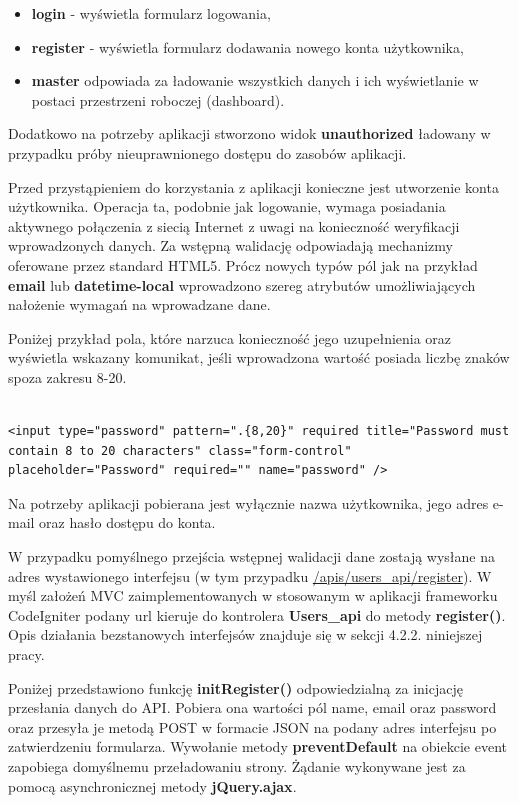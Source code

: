 \begin{itemize}
\item \textbf{login} - wyświetla formularz logowania,
\item \textbf{register} - wyświetla formularz dodawania nowego konta użytkownika,
\item \textbf{master} odpowiada za ładowanie wszystkich danych i ich wyświetlanie w postaci przestrzeni roboczej (dashboard).
\end{itemize}

Dodatkowo na potrzeby aplikacji stworzono widok \textbf{unauthorized} ładowany w przypadku próby nieuprawnionego dostępu do zasobów aplikacji.

Przed przystąpieniem do korzystania z aplikacji konieczne jest utworzenie konta użytkownika. Operacja ta, podobnie jak logowanie, wymaga posiadania aktywnego połączenia z siecią Internet z uwagi na konieczność weryfikacji wprowadzonych danych. Za wstępną walidację odpowiadają mechanizmy oferowane przez standard HTML5\cite{html5Valid}. Prócz nowych typów pól jak na przykład \textbf{email} lub \textbf{datetime-local} wprowadzono szereg atrybutów umożliwiających nałożenie wymagań na wprowadzane dane.

Poniżej przykład pola, które narzuca konieczność jego uzupełnienia oraz wyświetla wskazany komunikat, jeśli wprowadzona wartość posiada liczbę znaków spoza zakresu 8-20.

\begin{lstlisting}[caption=Przykład pola "hasło" w widoku rejestracji., label=amb, captionpos=b]

<input type="password" pattern=".{8,20}" required title="Password must contain 8 to 20 characters" class="form-control" placeholder="Password" required="" name="password" />

\end{lstlisting}

Na potrzeby aplikacji pobierana jest wyłącznie nazwa użytkownika, jego adres e-mail oraz hasło dostępu do konta.

W przypadku pomyślnego przejścia wstępnej walidacji dane zostają wysłane na adres wystawionego interfejsu (w tym przypadku \url{/apis/users_api/register}). W myśl założeń MVC zaimplementowanych w stosowanym w aplikacji frameworku CodeIgniter\cite{codeigniterUserGuide} podany url kieruje do kontrolera \textbf{Users\_api} do metody \textbf{register()}. Opis działania bezstanowych interfejsów znajduje się w sekcji 4.2.2. niniejszej pracy.

Poniżej przedstawiono funkcję \textbf{initRegister()} odpowiedzialną za inicjację przesłania danych do API. Pobiera ona wartości pól name, email oraz password oraz przesyła je metodą POST w formacie JSON na podany adres interfejsu po zatwierdzeniu formularza. Wywołanie metody \textbf{preventDefault} na obiekcie event zapobiega domyślnemu przeładowaniu strony. Żądanie wykonywane jest za pomocą asynchronicznej metody \textbf{jQuery.ajax}.

